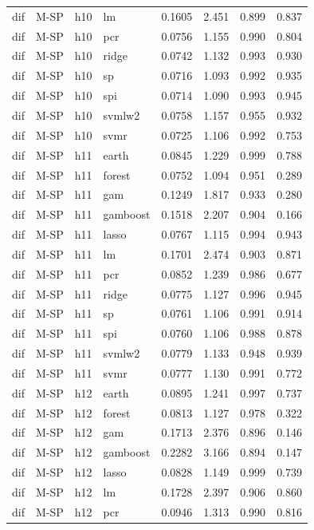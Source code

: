 \begin{ThreePartTable}
\begin{longtable}[t]{llclcccc}
dif & M-SP & h10 & lm & 0.1605 & 2.451 & 0.899 & 0.837\\
dif & M-SP & h10 & pcr & 0.0756 & 1.155 & 0.990 & 0.804\\
dif & M-SP & h10 & ridge & 0.0742 & 1.132 & 0.993 & 0.930\\
dif & M-SP & h10 & sp & 0.0716 & 1.093 & 0.992 & 0.935\\
dif & M-SP & h10 & spi & 0.0714 & 1.090 & 0.993 & 0.945\\
dif & M-SP & h10 & svmlw2 & 0.0758 & 1.157 & 0.955 & 0.932\\
dif & M-SP & h10 & svmr & 0.0725 & 1.106 & 0.992 & 0.753\\
\addlinespace
dif & M-SP & h11 & earth & 0.0845 & 1.229 & 0.999 & 0.788\\
dif & M-SP & h11 & forest & 0.0752 & 1.094 & 0.951 & 0.289\\
dif & M-SP & h11 & gam & 0.1249 & 1.817 & 0.933 & 0.280\\
dif & M-SP & h11 & gamboost & 0.1518 & 2.207 & 0.904 & 0.166\\
dif & M-SP & h11 & lasso & 0.0767 & 1.115 & 0.994 & 0.943\\
dif & M-SP & h11 & lm & 0.1701 & 2.474 & 0.903 & 0.871\\
dif & M-SP & h11 & pcr & 0.0852 & 1.239 & 0.986 & 0.677\\
dif & M-SP & h11 & ridge & 0.0775 & 1.127 & 0.996 & 0.945\\
dif & M-SP & h11 & sp & 0.0761 & 1.106 & 0.991 & 0.914\\
dif & M-SP & h11 & spi & 0.0760 & 1.106 & 0.988 & 0.878\\
dif & M-SP & h11 & svmlw2 & 0.0779 & 1.133 & 0.948 & 0.939\\
dif & M-SP & h11 & svmr & 0.0777 & 1.130 & 0.991 & 0.772\\
\addlinespace
dif & M-SP & h12 & earth & 0.0895 & 1.241 & 0.997 & 0.737\\
dif & M-SP & h12 & forest & 0.0813 & 1.127 & 0.978 & 0.322\\
dif & M-SP & h12 & gam & 0.1713 & 2.376 & 0.896 & 0.146\\
dif & M-SP & h12 & gamboost & 0.2282 & 3.166 & 0.894 & 0.147\\
dif & M-SP & h12 & lasso & 0.0828 & 1.149 & 0.999 & 0.739\\
dif & M-SP & h12 & lm & 0.1728 & 2.397 & 0.906 & 0.860\\
dif & M-SP & h12 & pcr & 0.0946 & 1.313 & 0.990 & 0.816\\

\end{longtable}
\end{ThreePartTable}
